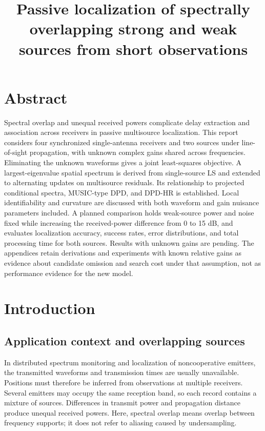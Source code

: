 \documentclass[11pt,a4paper]{article}
\title{\bfseries Passive localization of spectrally overlapping strong and weak sources from short observations}
\author{}
\date{}
\numberwithin{equation}{section}
\numberwithin{figure}{section}
\numberwithin{table}{section}
\begin{document}
\maketitle
\section*{Abstract}

Spectral overlap and unequal received powers complicate delay extraction and association across receivers in passive multisource localization. This report considers four synchronized single-antenna receivers and two sources under line-of-sight propagation, with unknown complex gains shared across frequencies. Eliminating the unknown waveforms gives a joint least-squares objective. A largest-eigenvalue spatial spectrum is derived from single-source LS and extended to alternating updates on multisource residuals. Its relationship to projected conditional spectra, MUSIC-type DPD, and DPD-HR is established. Local identifiability and curvature are discussed with both waveform and gain nuisance parameters included. A planned comparison holds weak-source power and noise fixed while increasing the received-power difference from 0 to 15 dB, and evaluates localization accuracy, success rates, error distributions, and total processing time for both sources. Results with unknown gains are pending. The appendices retain derivations and experiments with known relative gains as evidence about candidate omission and search cost under that assumption, not as performance evidence for the new model.

\section{Introduction}\label{sec:1}

\subsection{Application context and overlapping sources}\label{sec:1.1}

In distributed spectrum monitoring and localization of noncooperative emitters, the transmitted waveforms and transmission times are usually unavailable. Positions must therefore be inferred from observations at multiple receivers. Several emitters may occupy the same reception band, so each record contains a mixture of sources. Differences in transmit power and propagation distance produce unequal received powers. Here, spectral overlap means overlap between frequency supports; it does not refer to aliasing caused by undersampling.
\end{document}
